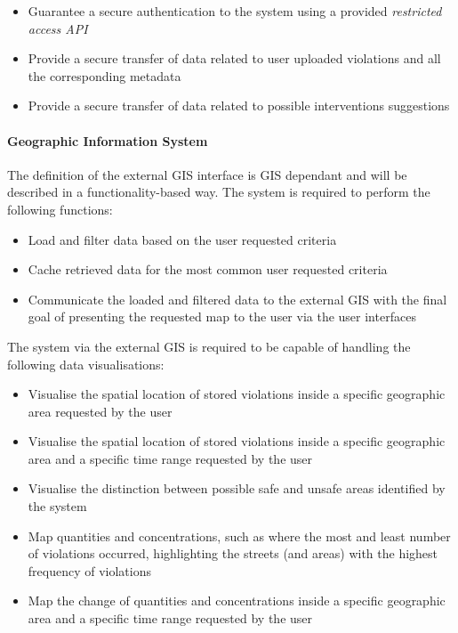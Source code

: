 	\begin{itemize}
		\item Guarantee a secure authentication to the system using a provided \emph{restricted access API}
		\item Provide a secure transfer of data related to user uploaded violations and all the corresponding metadata
		\item Provide a secure transfer of data related to possible interventions suggestions 
		
	\end{itemize} 
	
\clearpage

\paragraph{Geographic Information System} \label{p:gis} The definition of the external GIS interface is GIS dependant and will be described in a functionality-based way. The system is required to perform the following functions:

	\begin{itemize}
		\item Load and filter data based on the user requested criteria
		\item Cache retrieved data for the most common user requested criteria
		\item Communicate the loaded and filtered data to the external GIS with the final goal of presenting the requested map to the user via the user interfaces
		
		\end{itemize}
The system via the external GIS is required to be capable of handling the following data visualisations:
	
	\begin{itemize}
		\item Visualise the spatial location of stored violations inside a specific geographic area requested by the user
		\item Visualise the spatial location of stored violations inside a specific geographic area and a specific time range requested by the user
		\item Visualise the distinction between possible safe and unsafe areas identified by the system
		\item Map quantities and concentrations, such as where the most and least number of violations occurred, highlighting the streets (and areas) with the highest frequency of violations
		\item Map the change of quantities and concentrations inside a specific geographic area and a specific time range requested by the user \newline
	\end{itemize}

